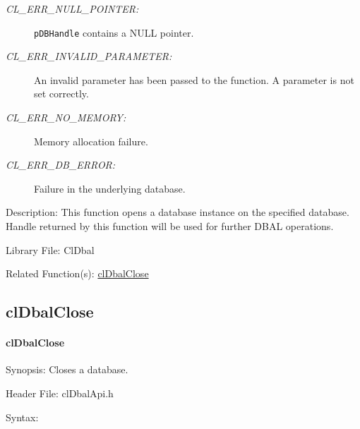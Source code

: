 \begin{flushleft}
\begin{Desc}
\begin{description}
\item[{\em CL\_\-ERR\_\-NULL\_\-POINTER:}]{\tt{pDBHandle}} contains a NULL pointer. 
\item[{\em CL\_\-ERR\_\-INVALID\_\-PARAMETER:}]An invalid parameter has been passed to the function. A parameter is not set correctly.
\item[{\em CL\_\-ERR\_\-NO\_\-MEMORY:}]Memory allocation failure. 
\item[{\em CL\_\-ERR\_\-DB\_\-ERROR:}]Failure in the underlying database.\end{description}
\end{Desc}
\begin{Desc}
\item[Description:]This function opens a database instance on the specified database. Handle returned by this function will be used for further DBAL 
operations.\end{Desc}
\begin{Desc}
\item[Library File:]Cl\-Dbal\end{Desc}
\begin{Desc}
\item[Related Function(s):]\hyperlink{pagedbal104}{cl\-Dbal\-Close} \end{Desc}


\newpage
\subsection{clDbalClose}
\hypertarget{pagedbal104}{}\paragraph{cl\-Dbal\-Close}\label{pagedbal104}
\begin{Desc}
\item[Synopsis:]Closes a database.\end{Desc}
\begin{Desc}
\item[Header File:]clDbalApi.h\end{Desc}
\begin{Desc}
\item[Syntax:]


\end{Desc}
\end{flushleft}

